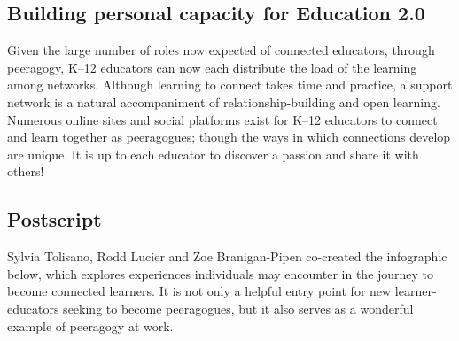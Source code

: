 \subsection{Building personal capacity for Education 2.0}

Given the large number of roles now expected of connected educators,
through peeragogy, K--12 educators can now each distribute the load of
the learning among networks. Although learning to connect takes time and
practice, a support network is a natural accompaniment of
relationship-building and open learning. Numerous online sites and
social platforms exist for K--12 educators to connect and learn together
as peeragogues; though the ways in which connections develop are unique.
It is up to each educator to discover a passion and share it with
others!

\subsection{Postscript}

Sylvia Tolisano, Rodd Lucier and Zoe Branigan-Pipen co-created the
infographic below, which explores experiences individuals may encounter
in the journey to become connected learners. It is not only a helpful
entry point for new learner-educators seeking to become peeragogues, but
it also serves as a wonderful example of peeragogy at work.

